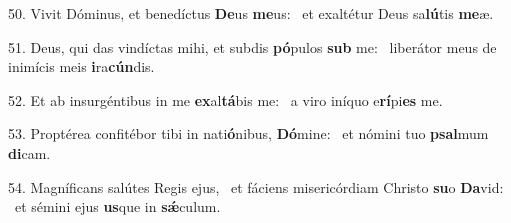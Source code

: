 50. Vivit Dóminus, et benedíctus \textbf{De}us \textbf{me}us: \ast\  et exaltétur Deus sa\textbf{lú}tis \textbf{me}æ.\

51. Deus, qui das vindíctas mihi, et subdis \textbf{pó}pulos \textbf{sub} me: \ast\  liberátor meus de inimícis meis \textbf{i}ra\textbf{cún}dis.\

52. Et ab insurgéntibus in me \textbf{ex}al\textbf{tá}bis me: \ast\  a viro iníquo e\textbf{rí}pi\textbf{es} me.\

53. Proptérea confitébor tibi in nati\textbf{ó}nibus, \textbf{Dó}mine: \ast\  et nómini tuo \textbf{psal}mum \textbf{di}cam.\

54. Magníficans salútes Regis ejus, \dag\  et fáciens misericórdiam Christo \textbf{su}o \textbf{Da}vid: \ast\  et sémini ejus \textbf{us}que in \textbf{sǽ}culum.\

